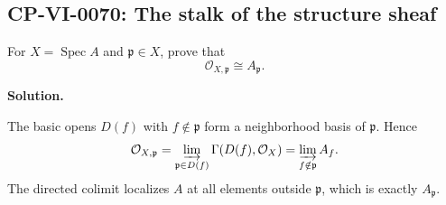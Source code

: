 
\subsection*{CP-VI-0070: The stalk of the structure sheaf}

For $X=\operatorname{Spec}A$ and $\mathfrak p\in X$, prove that
\[
\mathcal O_{X,\mathfrak p}\cong A_{\mathfrak p}.
\]

\medskip
\noindent\textbf{Solution.}

The basic opens $D(f)$ with $f\notin\mathfrak p$ form a neighborhood basis of $\mathfrak p$. Hence
\[
\mathcal O_{X,\mathfrak p}
=\varinjlim_{\mathfrak p\in D(f)}\Gamma(D(f),\mathcal O_X)
=\varinjlim_{f\notin\mathfrak p}A_f.
\]
The directed colimit localizes $A$ at all elements outside $\mathfrak p$, which is exactly $A_{\mathfrak p}$.
